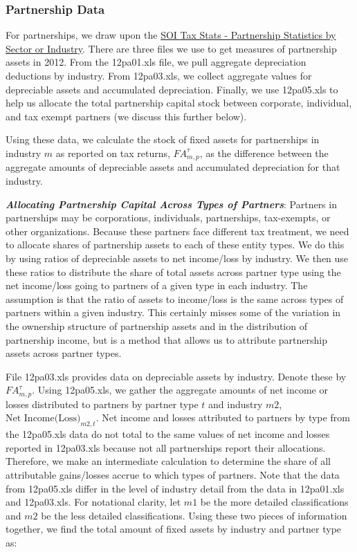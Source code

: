 \documentclass[article,11pt,letterpaper,fleqn]{article}
\theoremstyle{definition}
\numberwithin{equation}{section}
\begin{document}
\subsubsection{Partnership Data}

For partnerships, we draw upon the \href{http://www.irs.gov/uac/SOI-Tax-Stats-Partnership-Statistics-by-Sector-or-Industry}{SOI Tax Stats - Partnership Statistics by Sector or Industry}.  There are three files we use to get measures of partnership assets in 2012.  From the 12pa01.xls file, we pull aggregate depreciation deductions by industry.  From 12pa03.xls, we collect aggregate values for depreciable assets and accumulated depreciation.  Finally, we use 12pa05.xls to help us allocate the total partnership capital stock between corporate, individual, and tax exempt partners (we discuss this further below).

Using these data, we calculate the stock of fixed assets for partnerships in industry $m$ as reported on tax returns, ${FA}^{\tau}_{m,p}$, as the difference between the aggregate amounts of depreciable assets and accumulated depreciation for that industry.  
 
\textbf{\emph{Allocating Partnership Capital Across Types of Partners}}: Partners in partnerships may be corporations, individuals, partnerships, tax-exempts, or other organizations.  Because these partners face different tax treatment, we need to allocate shares of partnership assets to each of these entity types.  We do this by using ratios of depreciable assets to net income/loss by industry.  We then use these ratios to distribute the share of total assets across partner type using the net income/loss going to partners of a given type in each industry.  The assumption is that the ratio of assets to income/loss is the same across types of partners within a given industry.  This certainly misses some of the variation in the ownership structure of partnership assets and in the distribution of partnership income, but is a method that allows us to attribute partnership assets across partner types.

File 12pa03.xls provides data on depreciable assets by industry.  Denote these by $FA^{\tau}_{m,p}$.  Using 12pa05.xls, we gather the aggregate amounts of net income or losses distributed to partners by partner type $t$ and industry $m2$, $\text{Net Income(Loss)}_{m2,t}$.  Net income and losses attributed to partners by type from the 12pa05.xls data do not total to the same values of net income and losses reported in 12pa03.xls because not all partnerships report their allocations.  Therefore, we make an intermediate calculation to determine the share of all attributable gains/losses accrue to which types of partners.  Note that the data from 12pa05.xls differ in the level of industry detail from the data in 12pa01.xls and 12pa03.xls.  For notational clarity, let $m1$ be the more detailed classifications and $m2$ be the less detailed classifications.  Using these two pieces of information together, we find the total amount of fixed assets by industry and partner type as:  
\end{document}
